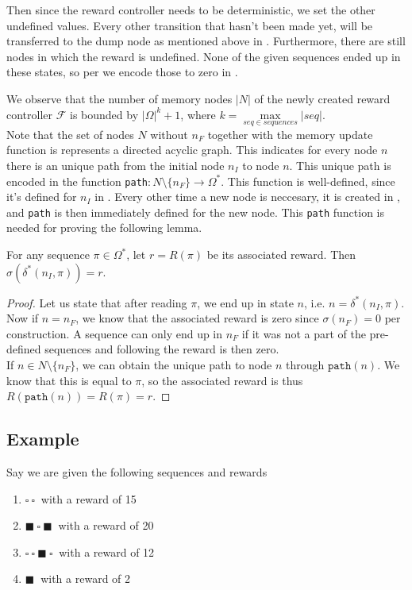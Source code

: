 Then since the reward controller needs to be deterministic, we set the other undefined values. Every other transition that hasn't been made yet, will be transferred to the dump node as mentioned above in . Furthermore, there are still nodes in which the reward is undefined. None of the given sequences ended up in these states, so per  we encode those to zero in .

We observe that the number of memory nodes $|N|$ of the newly created reward controller $\mathcal{F}$ is bounded by $|\Omega|^k + 1$, where $k=\max\limits_{seq\in sequences} |seq|$.\\

Note that the set of nodes $N$ without $n_F$ together with the memory update function is represents a directed acyclic graph. This indicates for every node $n$ there is an unique path from the initial node $n_I$ to node $n$. This unique path is encoded in the function \texttt{path}$:N\setminus\{n_F\}\to\Omega^*$. This function is well-defined, since it's defined for $n_I$ in . Every other time a new node is neccesary, it is created in , and \texttt{path} is then immediately defined for the new node. This \texttt{path} function is needed for proving the following lemma. 


\begin{lemma}
For any sequence $\pi\in\Omega^*$, let $r=R(\pi)$ be its associated reward. Then $\sigma(\delta^*(n_I,\pi))=r$.
\begin{proof}
Let us state that after reading $\pi$, we end up in state $n$, i.e. $n = \delta^*(n_I,\pi)$. \\
Now if $n=n_F$, we know that the associated reward is zero since $\sigma(n_F)=0$ per construction. A sequence can only end up in $n_F$ if it was not a part of the pre-defined sequences and following  the reward is then zero. \\
If $n\in N\setminus \{n_F\}$, we can obtain the unique path to node $n$ through $\texttt{path}(n)$. We know that this is equal to $\pi$, so the associated reward is thus $R(\texttt{path}(n))=R(\pi)=r$.
\end{proof}
\label{lem:reward_sequence}
\end{lemma}


\subsection*{Example}
Say we are given the following sequences and rewards
\begin{enumerate}
	\item $\square\ \square\  $ with a reward of 15
	\item $\blacksquare\ \square\ \blacksquare\ $ with a reward of 20
	\item $\square\ \square\ \blacksquare\ \square\ $ with a reward of 12
	\item  $\blacksquare\ $ with a reward of 2
\end{enumerate}

